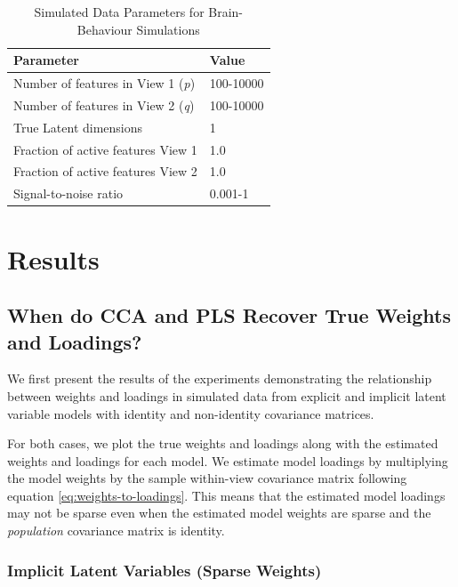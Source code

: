 \begin{table}
    \centering
    \caption{Simulated Data Parameters for Brain-Behaviour Simulations}
    \begin{tabular}{| l | l |}
        \hline
        \textbf{Parameter}                        & \textbf{Value}                               \\
        \hline
        Number of features in View 1 (\textit{p}) & 100-10000 \\
        Number of features in View 2 (\textit{q}) & 100-10000 \\
        True Latent dimensions                    & 1                                            \\
        Fraction of active features View 1            & 1.0                                          \\
        Fraction of active features View 2            & 1.0                                          \\
        Signal-to-noise ratio                    & 0.001-1 \\
        \hline
    \end{tabular}\label{tab:simulated-data-parameters-bb}
\end{table}

\section{Results}

\subsection{When do CCA and PLS Recover True Weights and Loadings?}

We first present the results of the experiments demonstrating the relationship between weights and \gls{loadings} in simulated data from explicit and implicit latent variable models with identity and non-identity covariance matrices.

For both cases, we plot the true weights and loadings along with the estimated weights and loadings for each model.
We estimate model loadings by multiplying the model weights by the sample within-view covariance matrix following equation \ref{eq:weights-to-loadings}.
This means that the estimated model loadings may not be sparse even when the estimated model weights are sparse and the \textit{population} covariance matrix is identity.

\subsubsection{Implicit Latent Variables (Sparse Weights)}

